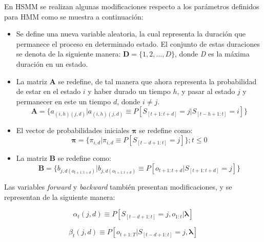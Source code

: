 En HSMM se realizan algunas modificaciones respecto a los parámetros definidos para HMM como se muestra a continuación:

\begin{itemize}
\item Se define una nueva variable aleatoria, la cual representa la duración que permanece el proceso en determinado estado. El conjunto de estas duraciones se denota de la siguiente manera: $\textbf{D} = \lbrace 1,2,...,D \rbrace$, donde \textit{D} es la máxima duración en un estado.

\item La matriz \textbf{A} se redefine, de tal manera que ahora representa la probabilidad de estar en el estado $i$ y haber durado un tiempo $h$, y pasar al estado $j$ y permanecer en este un tiempo $d$, donde $i \neq j$. 
  \begin{equation}
    \textbf{A} = \lbrace a_{(i,h)(j,d)} \vert a_{(i,h)(j,d)} \equiv P \left[ S_{[t+1:t+d]} = j \vert S_{[t-h+1:t]} = i \right] \rbrace
  \end{equation}

\item El vector de probabilidades iniciales $\boldsymbol\pi$ se redefine como:
  \begin{equation}
    \boldsymbol\pi = \lbrace \pi_{i,d} \vert \pi_{i,d} \equiv P \left[ S_{[t-d+1:t]} = j \right] \rbrace ; t \leqslant 0
  \end{equation}

\item La matriz \textbf{B} se redefine como:
  \begin{equation}
    \textbf{B} = \lbrace b_{j,d(o_{t+1:t+d})} \vert b_{j,d(o_{t+1:t+d})} \equiv P \left[ o_{t+1:t+d} \vert S_{[t+1:t+d]} = j \right] \rbrace
  \end{equation}

\end{itemize}

Las variables \textit{forward} y \textit{backward} también presentan modificaciones, y se representan de la siguiente manera:

  \begin{equation}
    \alpha_{t}(j,d) \equiv P \left[ S_{[t-d+1:t]} = j, o_{1:t} \vert \boldsymbol\lambda \right]
  \end{equation}

  \begin{equation}
    \beta_{t}(j,d) \equiv P \left[ o_{t+1:T} \vert S_{[t-d+1:t]} = j, \boldsymbol\lambda \right]
  \end{equation}

